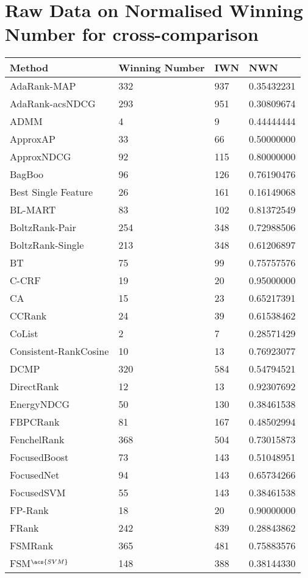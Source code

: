 \chapter{Raw Data on Normalised Winning Number for cross-comparison}
\label{app:norm_winnum_all}

\begin{longtable}{l|l|l|l}
Method & Winning Number & \acs{IWN} & \acs{NWN} \\
\hline
AdaRank-\acs{MAP} & 332 & 937 & 0.35432231 \\ 
AdaRank-acs{NDCG} & 293 & 951 & 0.30809674 \\ 
ADMM & 4 & 9 & 0.44444444 \\ 
Approx\acs{AP} & 33 & 66 & 0.50000000 \\ 
Approx\acs{NDCG} & 92 & 115 & 0.80000000 \\ 
BagBoo & 96 & 126 & 0.76190476 \\ 
Best Single Feature & 26 & 161 & 0.16149068 \\ 
BL-MART & 83 & 102 & 0.81372549 \\ 
BoltzRank-Pair & 254 & 348 & 0.72988506 \\ 
BoltzRank-Single & 213 & 348 & 0.61206897 \\ 
BT & 75 & 99 & 0.75757576 \\ 
C-CRF & 19 & 20 & 0.95000000 \\ 
CA & 15 & 23 & 0.65217391 \\ 
CCRank & 24 & 39 & 0.61538462 \\ 
CoList & 2 & 7 & 0.28571429 \\ 
Consistent-RankCosine & 10 & 13 & 0.76923077 \\ 
DCMP & 320 & 584 & 0.54794521 \\ 
DirectRank & 12 & 13 & 0.92307692 \\ 
Energy\acs{NDCG} & 50 & 130 & 0.38461538 \\ 
FBPCRank & 81 & 167 & 0.48502994 \\ 
FenchelRank & 368 & 504 & 0.73015873 \\ 
FocusedBoost & 73 & 143 & 0.51048951 \\ 
FocusedNet & 94 & 143 & 0.65734266 \\ 
Focused\acs{SVM} & 55 & 143 & 0.38461538 \\ 
FP-Rank & 18 & 20 & 0.90000000 \\ 
FRank & 242 & 839 & 0.28843862 \\ 
FSMRank & 365 & 481 & 0.75883576 \\ 
FSM$^{\acs{SVM}}$ & 148 & 388 & 0.38144330 \\ 

\end{longtable}
